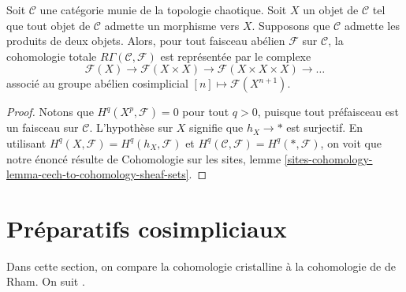 \begin{lemma}
\label{lemma-category-with-covering}
Soit $\mathcal{C}$ une catégorie munie de la topologie chaotique.
Soit $X$ un objet de $\mathcal{C}$ tel que tout objet de
$\mathcal{C}$ admette un morphisme vers $X$. Supposons que $\mathcal{C}$
admette les produits de deux objets.
Alors, pour tout faisceau abélien $\mathcal{F}$ sur $\mathcal{C}$,
la cohomologie totale $R\Gamma(\mathcal{C}, \mathcal{F})$ est représentée
par le complexe
$$
\mathcal{F}(X) \to \mathcal{F}(X \times X) \to
\mathcal{F}(X \times X \times X) \to \ldots
$$
associé au groupe abélien cosimplicial $[n] \mapsto \mathcal{F}(X^{n + 1})$.
\end{lemma}

\begin{proof}
Notons que $H^q(X^p, \mathcal{F}) = 0$ pour tout $q > 0$, puisque tout préfaisceau est un
faisceau sur $\mathcal{C}$. L'hypothèse sur $X$ signifie que $h_X \to *$
est surjectif. En utilisant $H^q(X, \mathcal{F}) = H^q(h_X, \mathcal{F})$ et
$H^q(\mathcal{C}, \mathcal{F}) = H^q(*, \mathcal{F})$, on voit que notre
énoncé résulte de
Cohomologie sur les sites,
lemme \ref{sites-cohomology-lemma-cech-to-cohomology-sheaf-sets}.
\end{proof}









\section{Préparatifs cosimpliciaux}
\label{section-cohomology}

\noindent
Dans cette section, on compare la cohomologie cristalline à la cohomologie
de de Rham. On suit \cite{Bhatt}.

